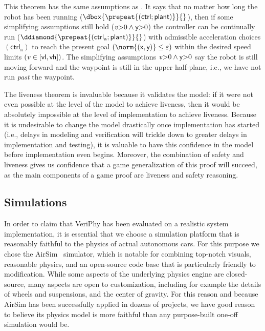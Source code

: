 \documentclass[12pt]{cmuthesis}
\theoremstyle{definition}
\theoremstyle{remark}
\newcommand{\xgvar}{\textsf{x}}
\newcommand{\ygvar}{\textsf{y}}
\newcommand{\yvar}{\textsf{y}}
\newcommand{\vlvar}{\textsf{vl}}
\newcommand{\vhvar}{\textsf{vh}}
\newcommand{\ctrl}{\textsf{ctrl}\xspace}
\newcommand{\ctrlliv}{\ctrl_{\text{a}}}
\newcommand{\plant}{\textsf{plant}\xspace}
\newcommand{\enorm}[1]{\norm{#1}}
\newcommand{\rref}[2][]{\prettyref{#2}}
\newcommand{\VeriPhy}{VeriPhy\xspace}
\begin{document}
This theorem has the same assumptions as \rref{thm:safe}. 
It says that no matter how long the robot has been running ($\dbox{\prepeat{(\ctrl;\plant)}}{}$), 
then if some simplifying assumptions still hold ($\vvar{>}0\land\yvar{>}0$) 
the controller can be continually run ($\ddiamond{\prepeat{(\ctrlliv;\plant)}}{}$) with admissible acceleration choices $(\ctrlliv)$ to reach the present goal \((\enorm{(\xgvar,\ygvar)} \leq \veps)\) within the desired speed limits \((\vvar \in [\vlvar,\vhvar])\).
The simplifying assumptions $\vvar{>}0\land\yvar{>}0$ say the robot is still moving forward and the waypoint is still in the upper half-plane, i.e., we have not run \emph{past} the waypoint.

The liveness theorem is invaluable because it validates the \dL model: if it were not even possible at the level of the \dL model to achieve liveness, then it would be absolutely impossible at the level of implementation to achieve liveness.
Because it is undesirable to change the model drastically once implementation has started (i.e., delays in modeling and verification will trickle down to greater delays in implementation and testing), it is valuable to have this confidence in the model before implementation even begins.
Moreover, the combination of safety and liveness gives us confidence that a game generalization of this proof will succeed, as the main components of a game proof are liveness and safety reasoning.

\subsection{Simulations} 
In order to claim that \VeriPhy has been evaluated on a realistic system implementation, it is essential that we choose a simulation platform that is reasonably faithful to the physics of actual autonomous cars.
For this purpose we chose the AirSim~\cite{shah2018airsim} simulator, which is notable for combining top-notch visuals, reasonable physics, and an open-source code base that is particularly friendly to modification.
While some aspects of the underlying physics engine are closed-source, many aspects are open to customization, including for example the details of wheels and suspensions, and the center of gravity.
For this reason and because AirSim has been successfully applied in dozens of projects, we have good reason to believe its physics model is more faithful than any purpose-built one-off simulation would be.
\end{document}
